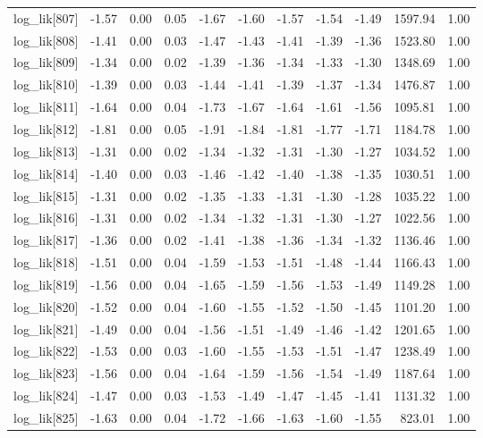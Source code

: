 \begin{table}[ht]
\begin{tabular}{rrrrrrrrrrr}
  log\_lik[807] & -1.57 & 0.00 & 0.05 & -1.67 & -1.60 & -1.57 & -1.54 & -1.49 & 1597.94 & 1.00 \\ 
  log\_lik[808] & -1.41 & 0.00 & 0.03 & -1.47 & -1.43 & -1.41 & -1.39 & -1.36 & 1523.80 & 1.00 \\ 
  log\_lik[809] & -1.34 & 0.00 & 0.02 & -1.39 & -1.36 & -1.34 & -1.33 & -1.30 & 1348.69 & 1.00 \\ 
  log\_lik[810] & -1.39 & 0.00 & 0.03 & -1.44 & -1.41 & -1.39 & -1.37 & -1.34 & 1476.87 & 1.00 \\ 
  log\_lik[811] & -1.64 & 0.00 & 0.04 & -1.73 & -1.67 & -1.64 & -1.61 & -1.56 & 1095.81 & 1.00 \\ 
  log\_lik[812] & -1.81 & 0.00 & 0.05 & -1.91 & -1.84 & -1.81 & -1.77 & -1.71 & 1184.78 & 1.00 \\ 
  log\_lik[813] & -1.31 & 0.00 & 0.02 & -1.34 & -1.32 & -1.31 & -1.30 & -1.27 & 1034.52 & 1.00 \\ 
  log\_lik[814] & -1.40 & 0.00 & 0.03 & -1.46 & -1.42 & -1.40 & -1.38 & -1.35 & 1030.51 & 1.00 \\ 
  log\_lik[815] & -1.31 & 0.00 & 0.02 & -1.35 & -1.33 & -1.31 & -1.30 & -1.28 & 1035.22 & 1.00 \\ 
  log\_lik[816] & -1.31 & 0.00 & 0.02 & -1.34 & -1.32 & -1.31 & -1.30 & -1.27 & 1022.56 & 1.00 \\ 
  log\_lik[817] & -1.36 & 0.00 & 0.02 & -1.41 & -1.38 & -1.36 & -1.34 & -1.32 & 1136.46 & 1.00 \\ 
  log\_lik[818] & -1.51 & 0.00 & 0.04 & -1.59 & -1.53 & -1.51 & -1.48 & -1.44 & 1166.43 & 1.00 \\ 
  log\_lik[819] & -1.56 & 0.00 & 0.04 & -1.65 & -1.59 & -1.56 & -1.53 & -1.49 & 1149.28 & 1.00 \\ 
  log\_lik[820] & -1.52 & 0.00 & 0.04 & -1.60 & -1.55 & -1.52 & -1.50 & -1.45 & 1101.20 & 1.00 \\ 
  log\_lik[821] & -1.49 & 0.00 & 0.04 & -1.56 & -1.51 & -1.49 & -1.46 & -1.42 & 1201.65 & 1.00 \\ 
  log\_lik[822] & -1.53 & 0.00 & 0.03 & -1.60 & -1.55 & -1.53 & -1.51 & -1.47 & 1238.49 & 1.00 \\ 
  log\_lik[823] & -1.56 & 0.00 & 0.04 & -1.64 & -1.59 & -1.56 & -1.54 & -1.49 & 1187.64 & 1.00 \\ 
  log\_lik[824] & -1.47 & 0.00 & 0.03 & -1.53 & -1.49 & -1.47 & -1.45 & -1.41 & 1131.32 & 1.00 \\ 
  log\_lik[825] & -1.63 & 0.00 & 0.04 & -1.72 & -1.66 & -1.63 & -1.60 & -1.55 & 823.01 & 1.00 \\ 

\end{tabular}
\end{table}
